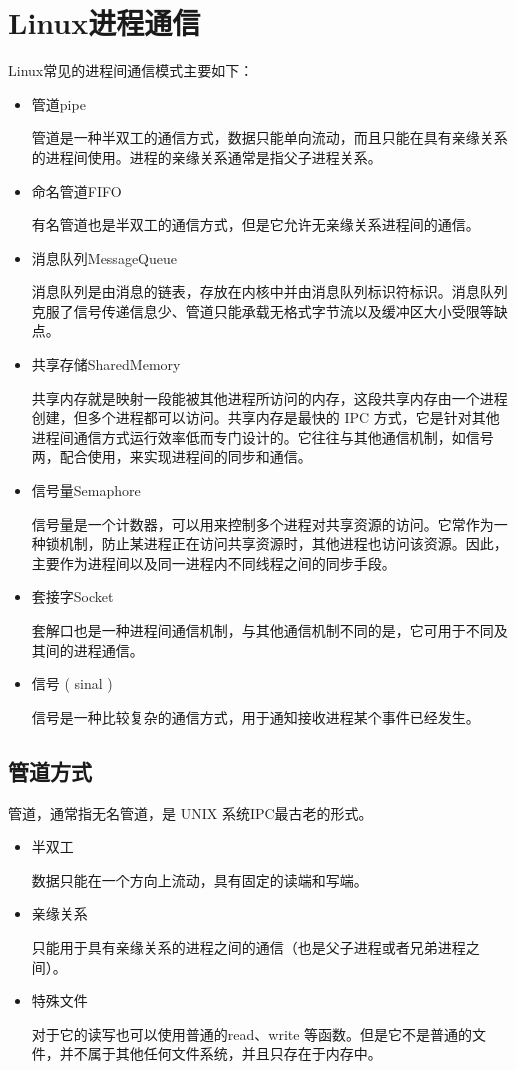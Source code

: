 \section{Linux进程通信}
Linux常见的进程间通信模式主要如下：
\begin{itemize}
    \item 管道pipe

            管道是一种半双工的通信方式，数据只能单向流动，而且只能在具有亲缘关系的进程间使用。进程的亲缘关系通常是指父子进程关系。
    \item 命名管道FIFO

            有名管道也是半双工的通信方式，但是它允许无亲缘关系进程间的通信。
    \item 消息队列MessageQueue

            消息队列是由消息的链表，存放在内核中并由消息队列标识符标识。消息队列克服了信号传递信息少、管道只能承载无格式字节流以及缓冲区大小受限等缺点。
    \item 共享存储SharedMemory

            共享内存就是映射一段能被其他进程所访问的内存，这段共享内存由一个进程创建，但多个进程都可以访问。共享内存是最快的 IPC 方式，它是针对其他进程间通信方式运行效率低而专门设计的。它往往与其他通信机制，如信号两，配合使用，来实现进程间的同步和通信。
    \item 信号量Semaphore

            信号量是一个计数器，可以用来控制多个进程对共享资源的访问。它常作为一种锁机制，防止某进程正在访问共享资源时，其他进程也访问该资源。因此，主要作为进程间以及同一进程内不同线程之间的同步手段。
    \item 套接字Socket

            套解口也是一种进程间通信机制，与其他通信机制不同的是，它可用于不同及其间的进程通信。
    \item 信号 ( sinal )

            信号是一种比较复杂的通信方式，用于通知接收进程某个事件已经发生。
\end{itemize}

\subsection{管道方式}
管道，通常指无名管道，是 UNIX 系统IPC最古老的形式。
\begin{itemize}
    \item 半双工

            数据只能在一个方向上流动，具有固定的读端和写端。
    \item 亲缘关系

            只能用于具有亲缘关系的进程之间的通信（也是父子进程或者兄弟进程之间）。
    \item 特殊文件

            对于它的读写也可以使用普通的read、write 等函数。但是它不是普通的文件，并不属于其他任何文件系统，并且只存在于内存中。
\end{itemize}

